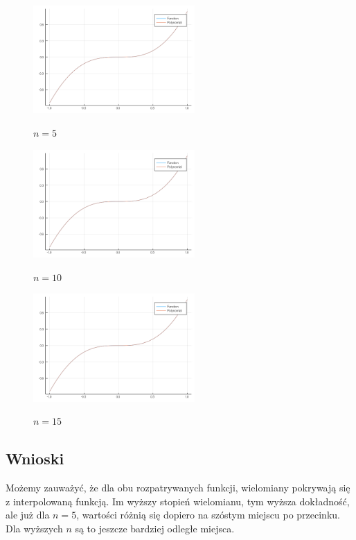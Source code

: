 \documentclass[12pt]{article}
\begin{document}
	\begin{figure}[!htbp]
		\centering
		{\includegraphics[width=0.55\textwidth]{4.png}}
		\caption{$n=5$}
	\end{figure}	
	\begin{figure}[!htbp]
		\centering
		{\includegraphics[width=0.55\textwidth]{5.png}}
		\caption{$n=10$}
	\end{figure}		
	\begin{figure}[!htbp]
		\centering
		{\includegraphics[width=0.55\textwidth]{6.png}}
		\caption{$n=15$}
	\end{figure}
	
\subsection{Wnioski}
Możemy zauważyć, że dla obu rozpatrywanych funkcji, wielomiany pokrywają się z interpolowaną funkcją. Im wyższy stopień wielomianu, tym wyższa dokładność, ale już dla $n=5$, wartości różnią się dopiero na szóstym miejscu po przecinku. Dla wyższych $n$ są to jeszcze bardziej odległe miejsca. 
\end{document}
